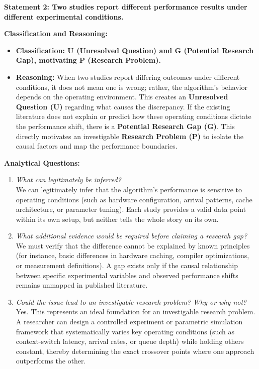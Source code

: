 \documentclass[11pt]{article}
\newcommand{\qLabel}[1]{
    {\fontsize{12}{14.4}\selectfont \textbf{#1}}
}
\begin{document}
\vspace{1.2em}


\newpage
\qLabel{Statement 2: Two studies report different performance results under different experimental conditions.}
\vspace{0.4em}

\noindent\textbf{Classification and Reasoning:}
\begin{itemize}[leftmargin=1.5em]
    \item \textbf{Classification: U (Unresolved Question) and G (Potential Research Gap), motivating P (Research Problem).}
    \item \textbf{Reasoning:} When two studies report differing outcomes under different conditions, it does not mean one is wrong; rather, the algorithm's behavior depends on the operating environment. This creates an \textbf{Unresolved Question (U)} regarding what causes the discrepancy. If the existing literature does not explain or predict how these operating conditions dictate the performance shift, there is a \textbf{Potential Research Gap (G)}. This directly motivates an investigable \textbf{Research Problem (P)} to isolate the causal factors and map the performance boundaries.
\end{itemize}

\noindent\textbf{Analytical Questions:}
\begin{enumerate}[leftmargin=1.5em]
    \item \textit{What can legitimately be inferred?} \\
    We can legitimately infer that the algorithm's performance is sensitive to operating conditions (such as hardware configuration, arrival patterns, cache architecture, or parameter tuning). Each study provides a valid data point within its own setup, but neither tells the whole story on its own.
    \item \textit{What additional evidence would be required before claiming a research gap?} \\
    We must verify that the difference cannot be explained by known principles (for instance, basic differences in hardware caching, compiler optimizations, or measurement definitions). A gap exists only if the causal relationship between specific experimental variables and observed performance shifts remains unmapped in published literature.
    \item \textit{Could the issue lead to an investigable research problem? Why or why not?} \\
    Yes. This represents an ideal foundation for an investigable research problem. A researcher can design a controlled experiment or parametric simulation framework that systematically varies key operating conditions (such as context-switch latency, arrival rates, or queue depth) while holding others constant, thereby determining the exact crossover points where one approach outperforms the other.
\end{enumerate}
\end{document}
